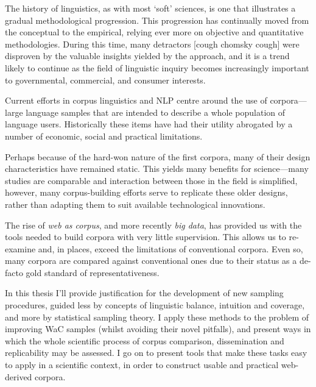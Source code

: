 The history of linguistics, as with most `soft' sciences, is one that illustrates a gradual methodological progression.  This progression has continually moved from the conceptual to the empirical, relying ever more on objective and quantitative methodologies.  During this time, many detractors [cough chomsky cough] were disproven by the valuable insights yielded by the approach, and it is a trend likely to continue as the field of linguistic inquiry becomes increasingly important to governmental, commercial, and consumer interests.


Current efforts in corpus linguistics and NLP centre around the use of corpora---large language samples that are intended to describe a whole population of language users.  Historically these items have had their utility abrogated by a number of economic, social and practical limitations.

Perhaps because of the hard-won nature of the first corpora, many of their design characteristics have remained static.  This yields many benefits for science---many studies are comparable and interaction between those in the field is simplified, however, many corpus-building efforts serve to replicate these older designs, rather than adapting them to suit available technological innovations.

The rise of \textsl{web as corpus}, and more recently \textsl{big data}, has provided us with the tools needed to build corpora with very little supervision.  This allows us to re-examine and, in places, exceed the limitations of conventional corpora.  Even so, many corpora are compared against conventional ones due to their status as a de-facto gold standard of representativeness.

In this thesis I'll provide justification for the development of new sampling procedures, guided less by concepts of linguistic balance, intuition and coverage, and more by statistical sampling theory.  I apply these methods to the problem of improving WaC samples (whilst avoiding their novel pitfalls), and present ways in which the whole scientific process of corpus comparison, dissemination and replicability may be assessed.  I go on to present tools that make these tasks easy to apply in a scientific context, in order to construct usable and practical web-derived corpora.


